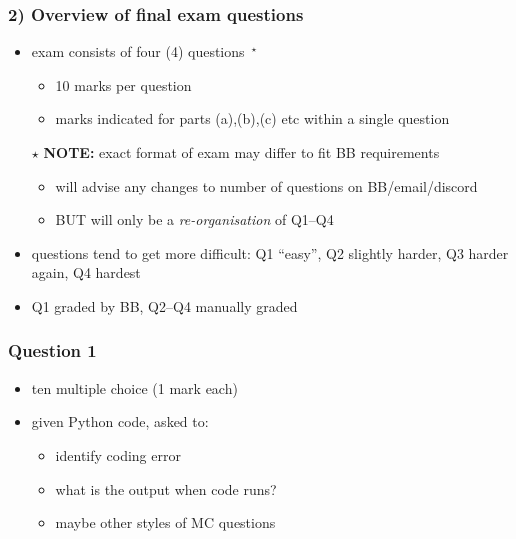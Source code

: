 \documentclass[english,14pt]{beamer}
\begin{document}

\begin{frame}[fragile]

\frametitle{2) Overview of final exam questions}

\begin{itemize}
	\item exam consists of four (4) questions~$^\star$
	\begin{itemize}
		\item 10 marks per question
		\item marks indicated for parts (a),(b),(c) etc within a single question
	\end{itemize}
	\item[$\star$] \textbf{NOTE:} exact format of exam may differ to fit BB requirements
		\begin{itemize}
		\item will advise any changes to number of questions on BB/email/discord
		\item BUT will only be a \emph{re-organisation} of Q1--Q4
	\end{itemize}

	\item questions tend to get more difficult: Q1 ``easy'', Q2 slightly harder, Q3 harder again, Q4 hardest
	\item Q1 graded by BB, Q2--Q4 manually graded
\end{itemize}
\end{frame}


\begin{frame}[fragile]

\frametitle{Question 1}

\begin{itemize}
	\item ten multiple choice (1 mark each)
	\item given Python code, asked to:
	\begin{itemize}
		\item identify coding error
		\item what is the output when code runs?
		\item maybe other styles of MC questions
	\end{itemize}
	
\end{itemize}

\end{frame}
\end{document}
